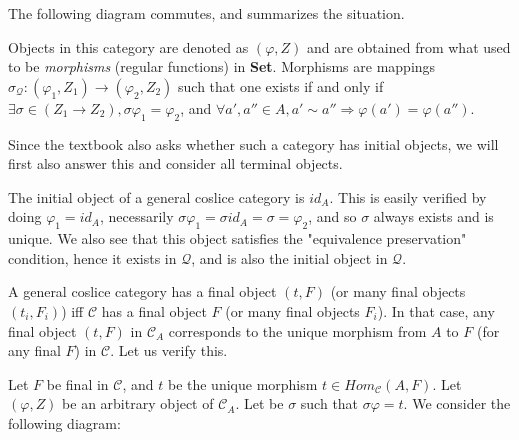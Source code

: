 The following diagram commutes, and summarizes the situation.


Objects in this category are denoted as $(\varphi, Z)$ and are obtained from what used to be \textit{morphisms} (regular functions) in \textbf{Set}. Morphisms are mappings $\sigma_{\mathcal{Q}} : (\varphi_1, Z_1) \to (\varphi_2, Z_2)$ such that one exists if and only if $\exists \sigma \in (Z_1 \to Z_2), \sigma \varphi_1 = \varphi_2$, and $\forall a', a'' \in A, a' \sim a'' \Rightarrow \varphi(a') = \varphi(a'')$.

Since the textbook also asks whether such a category has initial objects, we will first also answer this and consider all terminal objects.

The initial object of a general coslice category is $id_A$. This is easily verified by doing $\varphi_1 = id_A$, necessarily $\sigma \varphi_1 = \sigma id_A = \sigma = \varphi_2$, and so $\sigma$ always exists and is unique. We also see that this object satisfies the "equivalence preservation" condition, hence it exists in $\mathcal{Q}$, and is also the initial object in $\mathcal{Q}$.

A general coslice category has a final object $(t, F)$ (or many final objects $(t_i, F_i)$) iff $\mathcal{C}$ has a final object $F$ (or many final objects $F_i$). In that case, any final object $(t, F)$ in $\mathcal{C}_A$ corresponds to the unique morphism from $A$ to $F$ (for any final $F$) in $\mathcal{C}$. Let us verify this.

Let $F$ be final in $\mathcal{C}$, and $t$ be the unique morphism $t \in Hom_{\mathcal{C}} (A, F)$. Let $(\varphi, Z)$ be an arbitrary object of $\mathcal{C}_A$. Let be $\sigma$ such that $\sigma \varphi = t$. We consider the following diagram:

